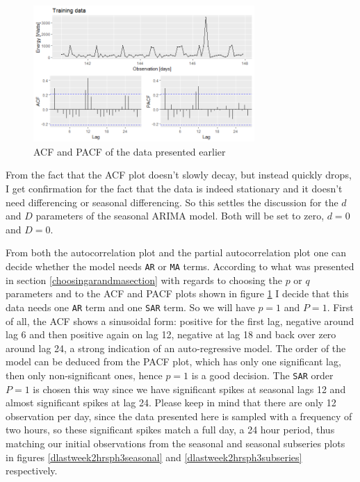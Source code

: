 \documentclass[12pt,a4paper,titlepage]{report}
\begin{document}
\begin{figure}[h]
    \centering
    \includegraphics[width=0.75\textwidth]{dlastweek2hrsph3acfpacf}
    \caption{ACF and PACF of the data presented earlier}
    \label{dlastweek2hrsph3acfpacf}
\end{figure}

From the fact that the ACF plot doesn't slowly decay, but instead quickly drops, I get confirmation for the fact that the data is indeed stationary and it doesn't need differencing or seasonal differencing. So this settles the discussion for the $ d $ and $ D $ parameters of the seasonal ARIMA model. Both will be set to zero, $ d = 0 $ and $ D = 0 $.

From both the autocorrelation plot and the partial autocorrelation plot one can decide whether the model needs \texttt{AR} or \texttt{MA} terms.
According to what was presented in section \ref{choosingarandmasection} with regards to choosing the $ p $ or $ q $ parameters and to the ACF and PACF plots shown in figure \ref{dlastweek2hrsph3acfpacf} I decide that this data needs one \texttt{AR} term and one \texttt{SAR} term. So we will have $ p = 1 $ and $ P = 1 $. First of all, the ACF shows a sinusoidal form: positive for the first lag, negative around lag 6 and then positive again on lag 12, negative at lag 18 and back over zero around lag 24, a strong indication of an auto-regressive model. The order of the model can be deduced from the PACF plot, which has only one significant lag, then only non-significant ones, hence $ p = 1 $ is a good decision. The \texttt{SAR} order $ P = 1 $ is chosen this way since we have significant spikes at seasonal lags 12 and almost significant spikes at lag 24. Please keep in mind that there are only 12 observation per day, since the data presented here is sampled with a frequency of two hours, so these significant spikes match a full day, a 24 hour period, thus matching our initial observations from the seasonal and seasonal subseries plots in figures \ref{dlastweek2hrsph3seasonal} and \ref{dlastweek2hrsph3subseries} respectively.
\end{document}
